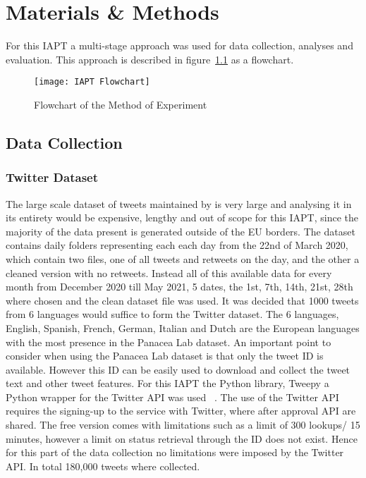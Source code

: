 \chapter{Materials \& Methods}

For this \ac{IAPT} a multi-stage approach was used for data collection, analyses and evaluation.
This approach is described in figure~\ref{fig:flowchart} as a flowchart.

\begin{figure}[h!]
\texttt{[image: IAPT Flowchart]}
\caption[Method Flowchart]{Flowchart of the Method of Experiment}
\label{fig:flowchart}
\end{figure}

\section{Data Collection}

\subsection{Twitter Dataset}

The large scale dataset of tweets maintained by \citet{banda2020largescale} is very large and analysing it in its entirety would be expensive, lengthy and out of scope for this \ac{IAPT}, since the majority of the data present is generated outside of the \ac{EU} borders.
The dataset contains daily folders representing each each day from the 22nd of March 2020, which contain two files, one of all tweets and retweets on the day, and the other a cleaned version with no retweets.
Instead all of this available data for every month from December 2020 till May 2021, 5 dates, the 1st, 7th, 14th, 21st, 28th where chosen and the clean dataset file was used.
It was decided that 1000 tweets from 6 languages would suffice to form the Twitter dataset.
The 6 languages, English, Spanish, French, German, Italian and Dutch are the European languages with the most presence in the Panacea Lab dataset.
An important point to consider when using the Panacea Lab dataset is that only the tweet ID is available.
However this ID can be easily used to download and collect the tweet text and other tweet features.
For this \ac{IAPT} the Python library, Tweepy a Python wrapper for the Twitter \ac{API} was used ~\citep{roesslein2020tweepy}.
The use of the Twitter \ac{API} requires the signing-up to the service with Twitter, where after approval \ac{API} are shared.
The free version comes with limitations such as a limit of 300 lookups/ 15 minutes, however a limit on status retrieval through the ID does not exist.
Hence for this part of the data collection no limitations were imposed by the Twitter \ac{API}.
In total 180,000 tweets where collected.


